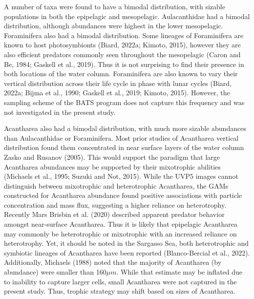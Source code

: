 \documentclass[
]{article}
\begin{document}
A number of taxa were found to have a bimodal distribution, with sizable
populations in both the epipelagic and mesopelagic. Aulacanthidae had a
bimodal distribution, although abundances were highest in the lower
mesopelagic. Foraminifera also had a bimodal distribution. Some lineages
of Foraminifera are known to host photosymbionts (Biard, 2022a; Kimoto,
2015), however they are also efficient predators commonly seen
throughout the mesopelagic (Caron and Be, 1984; Gaskell et al., 2019).
Thus it is not surprising to find their presence in both locations of
the water column. Foraminifera are also known to vary their vertical
distribution across their life cycle in phase with lunar cycles (Biard,
2022a; Bijma et al., 1990; Gaskell et al., 2019; Kimoto, 2015). However,
the sampling scheme of the BATS program does not capture this frequency
and was not investigated in the present study.

Acantharea also had a bimodal distribution, with much more sizable
abundances than Aulacanthidae or Foraminifera. Most prior studies of
Acantharea vertical distribution found them concentrated in near surface
layers of the water column Zasko and Rusanov (2005). This would support
the paradigm that large Acantharea abundances may be supported by their
mixotrophic abilities (Michaels et al., 1995; Suzuki and Not, 2015).
While the UVP5 images cannot distinguish between mixotrophic and
heterotrophic Acantharea, the GAMs constructed for Acantharea abundance
found positive associations with particle concentration and mass flux,
suggesting a higher reliance on heterotrophy. Recently Mars Brisbin et
al. (2020) described apparent predator behavior amongst near-surface
Acantharea. Thus it is likely that epipelagic Acantharea may commonly be
heterotrophic or mixotrophic with an increased reliance on heterotrophy.
Yet, it should be noted in the Sargasso Sea, both heterotrophic and
symbiotic lineages of Acantharea have been reported (Blanco-Bercial et
al., 2022). Additionally, Michaels (1988) noted that the majority of
Acantharea (by abundance) were smaller than 160\(\mu m\). While that
estimate may be inflated due to inability to capture larger cells, small
Acantharea were not captured in the present study. Thus, trophic
strategy may shift based on sizes of Acantharea.
\end{document}
